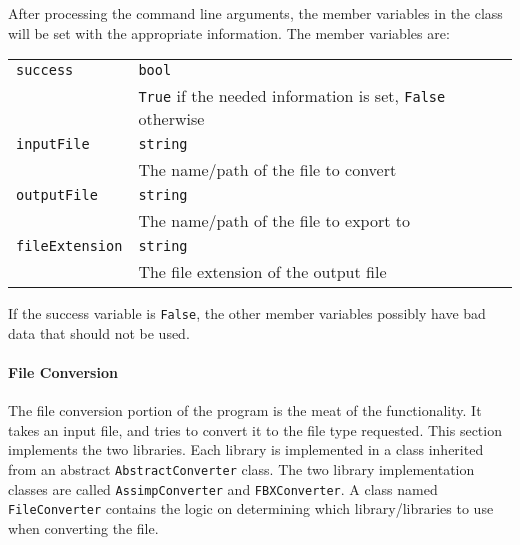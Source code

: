     After processing the command line arguments, the member variables in the class will be set with the appropriate information.  The member variables are:

    \begin{tabular}{l l}
        \centering
        \texttt{success} & \texttt{bool} \\
        & \texttt{True} if the needed information is set, \texttt{False} otherwise \\

        \texttt{inputFile} & \texttt{string} \\
        & The name/path of the file to convert \\

        \texttt{outputFile} & \texttt{string} \\
        & The name/path of the file to export to \\

        \texttt{fileExtension} & \texttt{string} \\
        & The file extension of the output file
    \end{tabular}

    If the success variable is \texttt{False}, the other member variables possibly have bad data that should not be used.

    \paragraph{File Conversion}
    \hfill \break
    The file conversion portion of the program is the meat of the functionality.  It takes an input file, and tries to convert it to the file type requested.
    This section implements the two libraries.  Each library is implemented in a class inherited from an abstract \texttt{AbstractConverter} class.  The two 
    library implementation classes are called \texttt{AssimpConverter} and \texttt{FBXConverter}.  A class named \texttt{FileConverter} contains the logic on determining which 
    library/libraries to use when converting the file.

